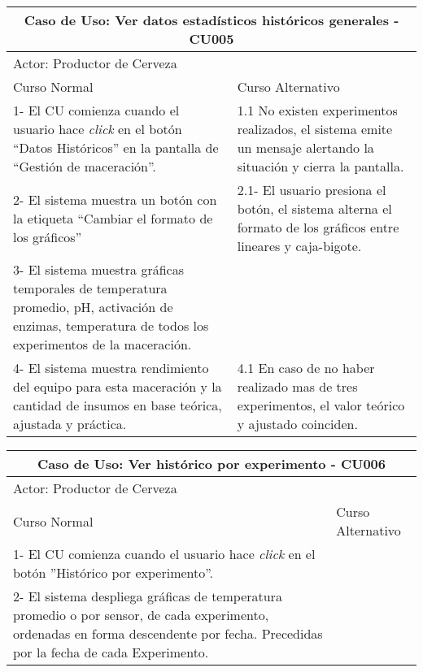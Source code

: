     
    \begin{minipage}{0.95\textwidth}
    \begin{center}
    \begin{tabularx}{\textwidth}{ | X | X |}
        \hline
        \multicolumn{2}{|c|}{\textbf{Caso de Uso: Ver datos estadísticos históricos generales - CU005}} \\
        \hline
        \multicolumn{2}{|l|}{Actor: Productor de Cerveza} \\
        \hline
        Curso Normal & Curso Alternativo \\
        \hline
        1- El CU comienza cuando el usuario hace \textit{click} en el botón “Datos Históricos” en la pantalla de ``Gestión de maceración''. & 1.1 No existen experimentos realizados, el sistema emite un mensaje alertando la situación y cierra la pantalla.\\
        \hline
        2- El sistema muestra un botón con la etiqueta ``Cambiar el formato de los gráficos''& 2.1- El usuario presiona el botón, el sistema alterna el formato de los gráficos entre lineares y caja-bigote. \\
        \hline
        
        3- El sistema muestra gráficas temporales de temperatura promedio, pH, activación de enzimas, temperatura de todos los experimentos de la maceración. & \\
        \hline
        
        4- El sistema muestra rendimiento del equipo para esta maceración y la cantidad de insumos en base teórica, ajustada y práctica. & 4.1 En caso de no haber realizado mas de tres experimentos, el valor teórico y ajustado coinciden.\\
        \hline
    
    \end{tabularx}
    \label{CU005}
    \end{center}
    \end{minipage}
    
    
    \begin{minipage}{0.95\textwidth}
    \begin{center}
    \begin{tabularx}{\textwidth}{ | X | X |}
        \hline
        \multicolumn{2}{|c|}{\textbf{Caso de Uso: Ver histórico por experimento - CU006}} \\
        \hline
        \multicolumn{2}{|l|}{Actor: Productor de Cerveza} \\
        \hline
        Curso Normal & Curso Alternativo \\
        \hline
        1- El CU comienza cuando el usuario hace \textit{click} en el botón ”Histórico por experimento”. & \\
        \hline
        2- El sistema despliega gráficas de temperatura promedio o por sensor, de cada experimento, ordenadas en forma descendente por fecha. Precedidas por la fecha de cada Experimento. & 
        \\
        \hline
    \end{tabularx}
    \label{CU006}
    \end{center}
    \end{minipage}
    
